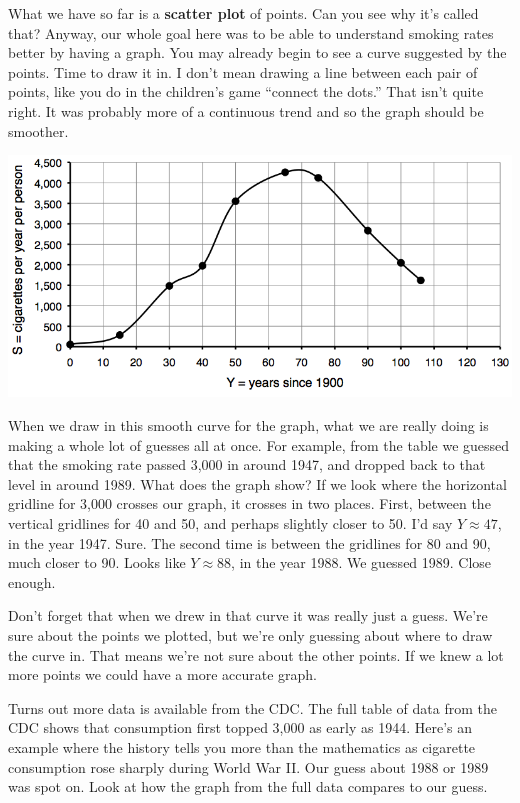What we have so far is a \textbf{scatter plot} of points.  Can you see why it's called that?  Anyway, our whole goal here was to be able to understand smoking rates better by having a graph.  You may already begin to see a curve suggested by the points. Time to draw it in.  I don't mean drawing a line between each pair of points, like you do in the children's game ``connect the dots.''  That isn't quite right.  It was probably more of a continuous trend and so the graph should be smoother.  
\begin{center}
 {\includegraphics [width = 6in] {CigCurve.png}}
\end{center}

When we draw in this smooth curve for the graph, what we are really doing is making a whole lot of guesses all at once.  For example, from the table we guessed that the smoking rate passed  3,000 in around 1947, and dropped back to that level in around 1989.  What does the graph show?  If we look where the horizontal gridline for 3,000 crosses our graph, it crosses in two places.  First, between the vertical gridlines for 40 and 50, and perhaps slightly closer to 50.  I'd say $Y \approx 47$, in the year 1947.  Sure.  The second time is between the gridlines for 80 and 90, much closer to 90.  Looks like $Y \approx 88$, in the year 1988. We guessed 1989.  Close enough.

Don't forget that when we drew in that curve it was really just a guess.  We're sure about the points we plotted, but we're only guessing about where to draw the curve in.  That means we're not sure about the other points.  If we knew a lot more points we could have a more accurate graph. 

Turns out  more data is available from the CDC.  The full table of data from the CDC shows that consumption first topped 3,000 as early as 1944.  Here's an example where the history tells you more than the mathematics as cigarette consumption rose sharply during World War II.  Our guess about 1988 or 1989 was spot on.  Look at how the graph from the full data compares to our guess.  

